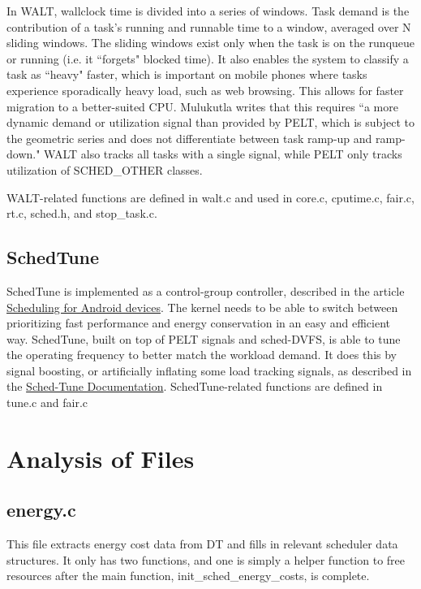 \documentclass{article}
\begin{document}
\par
In WALT, wallclock time is divided into a series of windows. Task demand is the contribution of a task's running and runnable time to a window, averaged over N sliding windows. The sliding windows exist only when the task is on the runqueue or running (i.e. it ``forgets" blocked time). It also enables the system to classify a task as ``heavy" faster, which is important on mobile phones where tasks experience sporadically heavy load, such as web browsing. This allows for faster migration to a better-suited CPU. Mulukutla writes that this requires ``a more dynamic demand or utilization signal than provided by PELT, which is subject to the geometric series and does not differentiate between task ramp-up and ramp-down." WALT also tracks all tasks with a single signal, while PELT only tracks utilization of SCHED\_OTHER classes.

\par
WALT-related functions are defined in walt.c and used in core.c, cputime.c, fair.c, rt.c, sched.h, and stop\_task.c.

\subsection{SchedTune}

SchedTune is implemented as a control-group controller, described in the article \href{http://lwn.net/Articles/706374/}{Scheduling for Android devices}. The kernel needs to be able to switch between prioritizing fast performance and energy conservation in an easy and efficient way. SchedTune, built on top of PELT signals and sched-DVFS, is able to tune the operating frequency to better match the workload demand. It does this by signal boosting, or artificially inflating some load tracking signals, as described in the \href{https://android.googlesource.com/kernel/common/+/android-4.4/Documentation/scheduler/sched-tune.txt}{Sched-Tune Documentation}. SchedTune-related functions are defined in tune.c and fair.c

\section{Analysis of Files}

\subsection{energy.c}

This file extracts energy cost data from DT and fills in relevant scheduler data structures. It only has two functions, and one is simply a helper function to free resources after the main function, init\_sched\_energy\_costs, is complete.
\end{document}
